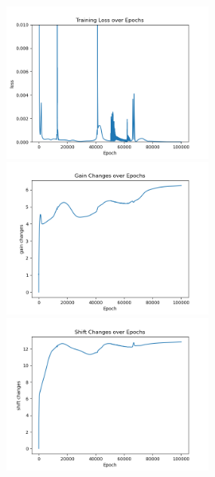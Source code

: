 \documentclass[12pt, a4paper]{article}
\begin{document}
\begin{figure}[H]
    \centering
    \includegraphics[width=0.6\textwidth]{RNN/ourRNN/analysis/fig/0221_SIN2_bphcppt_loss.png} \\
    \includegraphics[width=0.6\textwidth]{RNN/ourRNN/analysis/fig/0221_SIN2_bphcppt_gc.png} \\
    \includegraphics[width=0.6\textwidth]{RNN/ourRNN/analysis/fig/0221_SIN2_bphcppt_sc.png} \\
\end{figure}
\end{document}
